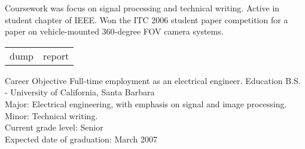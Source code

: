 \documentclass[letterpaper, 10pt]{article}
\begin{document}
{\begin{minipage}[t]{0.45\textwidth}
\begin{spacing}{0.5}
Coursework was focus on signal processing and technical writing. Active in student chapter of IEEE. 
Won the ITC 2006 student paper competition for a paper on vehicle-mounted 360-degree FOV camera systems.
\par\bigskip
%
\par
{}
\par \smallskip \smallskip
{}
\end{spacing} \end{minipage} 
\par
\par \bigskip}
\par\bigskip\bigskip\bigskip
\par
\par
\par
\par







\par\bigskip
\begin{tabular}{l | r} %
dump & report\\

\end{tabular}


\par{}

\begingroup
\raggedleft \noindent {}
\raggedright \noindent {}
\endgroup

\nrcsinglesection
{Career Objective}
{Full-time employment as an electrical engineer.}
\nrcsinglesection
{Education}
{B.S. - University of California, Santa Barbara \\
Major: Electrical engineering, with emphasis on signal and image processing.\\
Minor: Technical writing. \\
Current grade level: Senior \\
Expected date of graduation: March 2007 \\}
\end{document}
